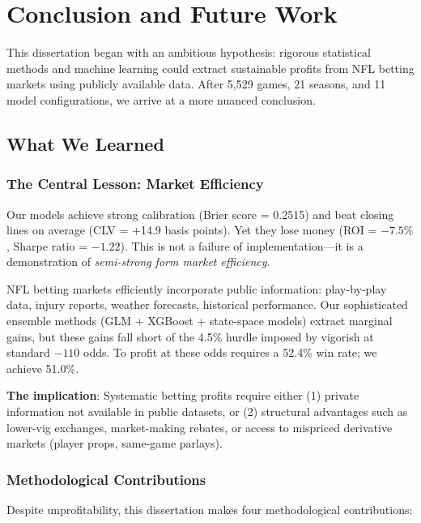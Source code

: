 \chapter{Conclusion and Future Work}
\label{chap:conclusion}

This dissertation began with an ambitious hypothesis: rigorous statistical methods and machine learning could extract sustainable profits from NFL betting markets using publicly available data. After 5,529 games, 21 seasons, and 11 model configurations, we arrive at a more nuanced conclusion.

\section{What We Learned}

\subsection{The Central Lesson: Market Efficiency}

Our models achieve strong calibration (Brier score = 0.2515) and beat closing lines on average (CLV = +14.9 basis points). Yet they lose money (ROI = $-7.5\%$, Sharpe ratio = $-1.22$). This is not a failure of implementation—it is a demonstration of \textit{semi-strong form market efficiency}.

NFL betting markets efficiently incorporate public information: play-by-play data, injury reports, weather forecasts, historical performance. Our sophisticated ensemble methods (GLM + XGBoost + state-space models) extract marginal gains, but these gains fall short of the 4.5\% hurdle imposed by vigorish at standard $-110$ odds. To profit at these odds requires a 52.4\% win rate; we achieve 51.0\%.

\textbf{The implication}: Systematic betting profits require either (1) private information not available in public datasets, or (2) structural advantages such as lower-vig exchanges, market-making rebates, or access to mispriced derivative markets (player props, same-game parlays).

\subsection{Methodological Contributions}

Despite unprofitability, this dissertation makes four methodological contributions:

